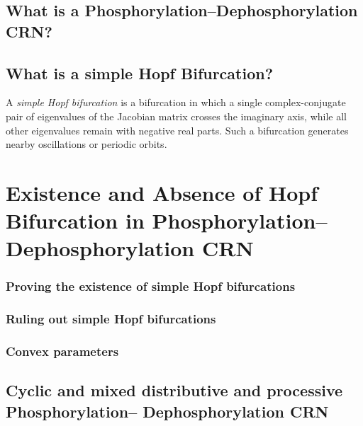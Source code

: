 \section{What is a Phosphorylation–Dephosphorylation CRN?}

\section{What is a simple Hopf Bifurcation?}
A \textit{simple Hopf bifurcation} is a bifurcation in which a single complex-conjugate pair of eigenvalues of the Jacobian matrix crosses the imaginary axis, while all other eigenvalues remain with negative real parts. Such a bifurcation generates nearby oscillations or periodic orbits.

\chapter{Existence and Absence of Hopf Bifurcation in Phosphorylation–Dephosphorylation CRN}

\subsection{Proving the existence of simple Hopf bifurcations}

\subsection{Ruling out simple Hopf bifurcations}

\subsection{Convex parameters}

\section{Cyclic and mixed distributive and processive Phosphorylation– \newline
Dephosphorylation CRN}